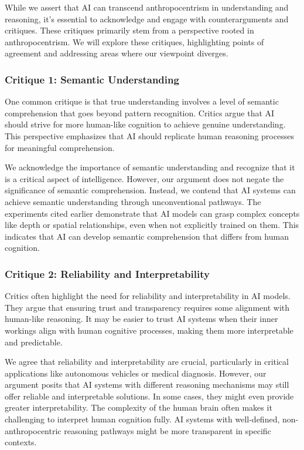 \documentclass{article}
\begin{document}
While we assert that AI can transcend anthropocentrism in understanding and reasoning, it's essential to acknowledge and engage with counterarguments and critiques. These critiques primarily stem from a perspective rooted in anthropocentrism. We will explore these critiques, highlighting points of agreement and addressing areas where our viewpoint diverges.

\subsubsection{Critique 1: Semantic Understanding}

One common critique is that true understanding involves a level of semantic comprehension that goes beyond pattern recognition. 
Critics argue that AI should strive for more human-like cognition to achieve genuine understanding. 
This perspective emphasizes that AI should replicate human reasoning processes for meaningful comprehension.\par

We acknowledge the importance of semantic understanding and recognize that it is a critical aspect of intelligence. 
However, our argument does not negate the significance of semantic comprehension. 
Instead, we contend that AI systems can achieve semantic understanding through unconventional pathways. 
The experiments cited earlier demonstrate that AI models can grasp complex concepts like depth or spatial relationships, even when not explicitly trained on them. 
This indicates that AI can develop semantic comprehension that differs from human cognition.\par

\subsubsection{Critique 2: Reliability and Interpretability}

Critics often highlight the need for reliability and interpretability in AI models. 
They argue that ensuring trust and transparency requires some alignment with human-like reasoning. 
It may be easier to trust AI systems when their inner workings align with human cognitive processes, making them more interpretable and predictable.\par

We agree that reliability and interpretability are crucial, particularly in critical applications like autonomous vehicles or medical diagnosis. 
However, our argument posits that AI systems with different reasoning mechanisms may still offer reliable and interpretable solutions. 
In some cases, they might even provide greater interpretability. 
The complexity of the human brain often makes it challenging to interpret human cognition fully. 
AI systems with well-defined, non-anthropocentric reasoning pathways might be more transparent in specific contexts.\par
\end{document}
